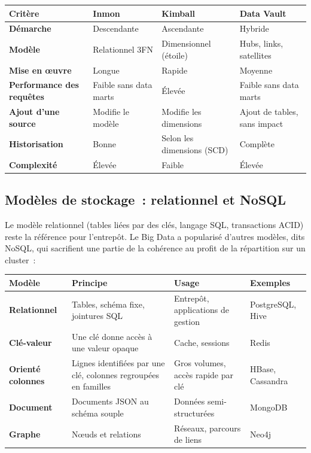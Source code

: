 \begin{center}
\begin{tabularx}{\textwidth}{>{\bfseries}l >{\raggedright\arraybackslash}X >{\raggedright\arraybackslash}X >{\raggedright\arraybackslash}X}
\toprule
Critère & Inmon & Kimball & Data Vault \\
\midrule
Démarche & Descendante & Ascendante & Hybride \\
Modèle & Relationnel 3FN & Dimensionnel (étoile) & Hubs, links, satellites \\
Mise en œuvre & Longue & Rapide & Moyenne \\
Performance des requêtes & Faible sans data marts & Élevée & Faible sans data marts \\
Ajout d'une source & Modifie le modèle & Modifie les dimensions & Ajout de tables, sans impact \\
Historisation & Bonne & Selon les dimensions (SCD) & Complète \\
Complexité & Élevée & Faible & Élevée \\
\bottomrule
\end{tabularx}
\end{center}

\subsection{Modèles de stockage~: relationnel et NoSQL}

\noindent Le modèle relationnel (tables liées par des clés, langage SQL, transactions ACID) reste la référence pour l'entrepôt. Le Big Data a popularisé d'autres modèles, dits NoSQL, qui sacrifient une partie de la cohérence au profit de la répartition sur un cluster~:

\begin{center}
\begin{tabularx}{\textwidth}{>{\bfseries}l >{\raggedright\arraybackslash}X >{\raggedright\arraybackslash}X l}
\toprule
Modèle & Principe & Usage & Exemples \\
\midrule
Relationnel & Tables, schéma fixe, jointures SQL & Entrepôt, applications de gestion & PostgreSQL, Hive \\
Clé-valeur & Une clé donne accès à une valeur opaque & Cache, sessions & Redis \\
Orienté colonnes & Lignes identifiées par une clé, colonnes regroupées en familles & Gros volumes, accès rapide par clé & HBase, Cassandra \\
Document & Documents JSON au schéma souple & Données semi-structurées & MongoDB \\
Graphe & Nœuds et relations & Réseaux, parcours de liens & Neo4j \\
\bottomrule
\end{tabularx}
\end{center}

